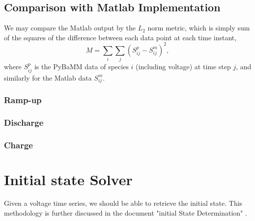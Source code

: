 \documentclass[11pt,twoside,a4paper]{article}
\begin{document}
\subsection{Comparison with Matlab Implementation}
We may compare the Matlab output by the $L_2$ norm metric, which is simply sum of the squares of the difference between each data point at each time instant,
%
\begin{equation}
M = \sum_i\sum_j (S_{ij}^p-S_{ij}^m)^2,
\end{equation}
%
where $S_{ij}^p$ is the PyBaMM data of species $i$ (including voltage) at time step $j$, and similarly for the Matlab data $S_{ij}^m$.
\subsubsection{Ramp-up}
\subsubsection{Discharge}
\subsubsection{Charge}

\section{Initial state Solver}
Given a voltage time series, we should be able to retrieve the initial state. This methodology is further discussed in the document "initial State Determination" . 
\end{document}
